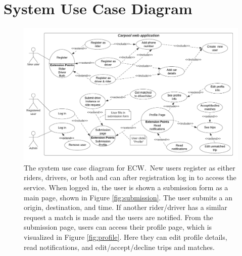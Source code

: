 \documentclass{article}
\newcommand{\namep}{ECW.}
\begin{document}
\newpage
\section{System Use Case Diagram}
\begin{figure}[!htpb]
    \centering
    \includegraphics[scale=0.8]{prdFigures/system_case_diagram.pdf}
    \caption{The system use case diagram for \namep \  New users register as either riders, drivers, or both and can after registration log in to access the service. When logged in, the user is shown a submission form as a main page, shown in Figure \ref{fig:submission}. The user submits a an origin, destination, and time. If another rider/driver has a similar request a match is made and the users are notified. From the submission page, users can access their profile page, which is visualized in Figure \ref{fig:profile}. Here they can edit profile details, read notifications, and edit/accept/decline trips and matches.}
    \label{fig:useCaseDiagram}
\end{figure}

\newpage
\end{document}
